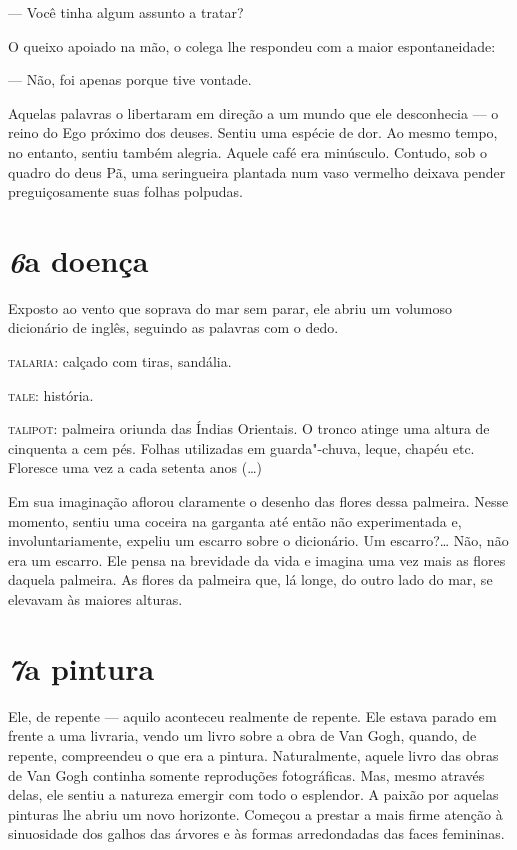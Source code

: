 --- Você tinha algum assunto a tratar?

O queixo apoiado na mão, o colega lhe respondeu com a maior
espontaneidade:

--- Não, foi apenas porque tive vontade.

Aquelas palavras o libertaram em direção a um mundo que ele desconhecia
--- o reino do Ego próximo dos deuses. Sentiu uma espécie de dor. Ao
mesmo tempo, no entanto, sentiu também alegria. Aquele café era
minúsculo. Contudo, sob o quadro do deus Pã, uma seringueira plantada
num vaso vermelho deixava pender preguiçosamente suas folhas polpudas.

\section*{\textit{6}\es a doença}

Exposto ao vento que soprava do mar sem parar, ele abriu um volumoso
dicionário de inglês, seguindo as palavras com o dedo.

\textsc{talaria}: calçado com tiras, sandália.

\textsc{tale}: história.

\textsc{talipot}: palmeira oriunda das Índias Orientais. O tronco atinge uma
altura de cinquenta a cem pés. Folhas utilizadas em guarda"-chuva, leque, 
chapéu etc. Floresce uma vez a cada setenta anos (\ldots{})

Em sua imaginação aflorou claramente o desenho das flores dessa
palmeira. Nesse momento, sentiu uma coceira na garganta até então não
experimentada e, involuntariamente, expeliu um escarro sobre o
dicionário. Um escarro?\ldots{} Não, não era um escarro. Ele pensa na
brevidade da vida e imagina uma vez mais as flores daquela palmeira. As
flores da palmeira que, lá longe, do outro lado do mar, se elevavam às
maiores alturas.

\section*{\textit{7}\es a pintura}

Ele, de repente --- aquilo aconteceu realmente de repente. Ele estava
parado em frente a uma livraria, vendo um livro sobre a obra de Van
Gogh, quando, de repente, compreendeu o que era a pintura.
Naturalmente, aquele livro das obras de Van Gogh continha somente
reproduções fotográficas. Mas, mesmo através delas, ele sentiu a
natureza emergir com todo o esplendor. A paixão por aquelas pinturas
lhe abriu um novo horizonte. Começou a prestar a mais firme atenção à
sinuosidade dos galhos das árvores e às formas arredondadas das faces
femininas.

